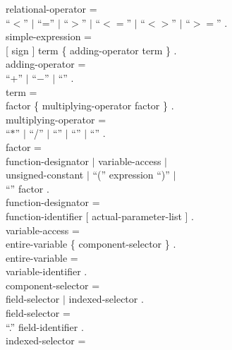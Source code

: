 \begin{grammar}
  {\GA}relational-operator =                              \\
    {\GB}``$<$'' $|$ ``='' $|$ ``$>$'' $|$
         ``$<=$'' $|$ ``$<>$'' $|$ ``$>=$'' .             \\
  {\GA}simple-expression =                                \\
    {\GB}[ sign ] term \{ adding-operator term \} .       \\
  {\GA}adding-operator =                                  \\
    {\GB}``+'' $|$ ``$-$'' $|$ ``{\Or}'' .                \\
  {\GA}term =                                             \\
    {\GB}factor \{ multiplying-operator factor \} .       \\
  {\GA}multiplying-operator =                             \\
    {\GB}``$*$'' $|$ ``/'' $|$ ``{\Div}'' $|$
         ``{\Mod}'' $|$ ``{\And}'' .                      \\
  {\GA}factor =                                           \\
    {\GB}function-designator $|$ variable-access $|$      \\
    {\GB}unsigned-constant $|$ ``('' expression ``)'' $|$ \\
    {\GB}``{\Not}'' factor .                              \\
  {\GA}function-designator =                              \\
    {\GB}function-identifier [ actual-parameter-list ] .  \\
  {\GA}variable-access =                                  \\
    {\GB}entire-variable \{ component-selector \} .       \\
  {\GA}entire-variable =                                  \\
    {\GB}variable-identifier .                            \\
  {\GA}component-selector =                               \\
    {\GB}field-selector $|$ indexed-selector .            \\
  {\GA}field-selector =                                   \\
    {\GB}``.'' field-identifier .                         \\
  {\GA}indexed-selector =                                 \\

\end{grammar}
